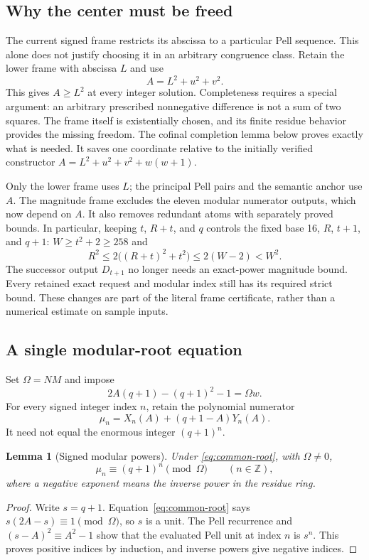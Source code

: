 \documentclass[11pt]{article}
\newtheorem{lemma}[theorem]{Lemma}
\theoremstyle{remark}\newtheorem{remark}[theorem]{Remark}
\newcommand{\Z}{\mathbb Z}\newcommand{\N}{\mathbb N}
\begin{document}
\subsection{Why the center must be freed}

The current signed frame restricts its abscissa to a particular Pell
sequence. This alone does not justify choosing it in an arbitrary
congruence class. Retain the lower frame with abscissa $L$ and use
\begin{equation}\label{eq:free-center}
                         A=L^2+u^2+v^2.
\end{equation}
This gives $A\ge L^2$ at every integer solution. Completeness requires
a special argument: an arbitrary prescribed nonnegative difference is
not a sum of two squares. The frame itself is existentially chosen,
and its finite residue behavior provides the missing freedom. The
cofinal completion lemma below proves exactly what is needed. It saves
one coordinate relative to the initially verified constructor
$A=L^2+u^2+v^2+w(w+1)$.

Only the lower frame uses $L$; the principal Pell pairs and the
semantic anchor use $A$. The magnitude frame excludes the eleven
modular numerator outputs, which now depend on $A$. It also removes
redundant atoms with separately proved bounds. In particular, keeping
$t$, $R+t$, and $q$ controls the fixed base 16, $R$, $t+1$, and $q+1$:
$W\ge t^2+2\ge258$ and
\[
 R^2\le2\bigl((R+t)^2+t^2\bigr)\le2(W-2)<W^2.
\]
The successor output $D_{t+1}$ no longer needs an exact-power magnitude
bound. Every retained exact request and modular index still has its
required strict bound. These changes are part of the literal frame
certificate, rather than a numerical estimate on sample inputs.

\subsection{A single modular-root equation}

Set $\Omega=NM$ and impose
\begin{equation}\label{eq:common-root}
 2A(q+1)-(q+1)^2-1=\Omega w.
\end{equation}
For every signed integer index $n$, retain the polynomial numerator
\begin{equation}\label{eq:mu}
 \mu_n=X_n(A)+(q+1-A)Y_n(A).
\end{equation}
It need not equal the enormous integer $(q+1)^n$.

\begin{lemma}[Signed modular powers]\label{lem:modular}
Under \eqref{eq:common-root}, with $\Omega\ne0$,
\[
 \mu_n\equiv(q+1)^n\pmod\Omega\qquad(n\in\Z),
\]
where a negative exponent means the inverse power in the residue ring.
\end{lemma}
\begin{proof}
Write $s=q+1$. Equation~\eqref{eq:common-root} says
$s(2A-s)\equiv1\pmod\Omega$, so $s$ is a unit. The Pell
recurrence and $(s-A)^2\equiv A^2-1$ show that the evaluated Pell
unit at index $n$ is $s^n$. This proves positive indices by induction,
and inverse powers give negative indices.
\end{proof}
\end{document}
